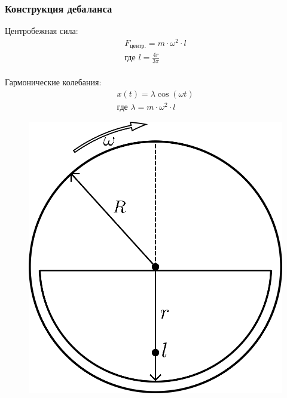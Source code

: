 \documentclass[10pt, pdf, hyperref={unicode}]{beamer}
\begin{document}
    \begin{frame}
        \frametitle{Конструкция дебаланса}
        \begin{center}
            \begin{minipage}[h]{0.97\linewidth}
                \begin{minipage}[h]{0.6\linewidth}
                    Центробежная сила:
                    \begin{equation*}
                        \begin{gathered}
                            F_{\textrm{центр.}} = m \cdot \omega^2 \cdot l \\
                            \textrm{где } l = \frac{4 r}{3 \pi}
                        \end{gathered}
                    \end{equation*}
                    \\
                    Гармонические колебания:
                    \begin{equation*}
                        \begin{gathered}
                            x(t) = \lambda \cos (\omega t) \\
                            \textrm{где } \lambda = m \cdot \omega^2 \cdot l
                        \end{gathered}
                    \end{equation*}
                \end{minipage}
                \hfill
                \begin{minipage}[h]{0.36\linewidth}
                    \begin{figure}[h]
                        \centering
                        \includegraphics[width=1\linewidth]{../img/debalance.png}

\end{figure}
\end{minipage}
\end{minipage}
\end{center}
\end{frame}
\end{document}
